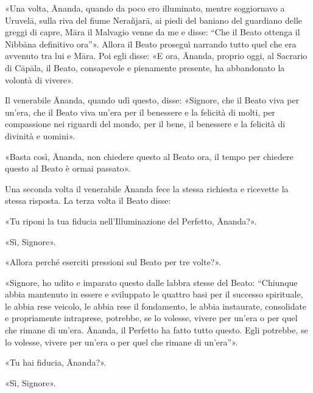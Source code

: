 
«Una volta, Ānanda, quando da poco ero illuminato, mentre soggiornavo a Uruvelā,
sulla riva del fiume Nerañjarā, ai piedi del baniano del guardiano delle greggi
di capre, Māra il Malvagio venne da me e disse: “Che il Beato ottenga il Nibbāna
definitivo ora”». Allora il Beato proseguì narrando tutto quel che era avvenuto
tra lui e Māra. Poi egli disse: «E ora, Ānanda, proprio oggi, al Sacrario di
Cāpāla, il Beato, consapevole e pienamente presente, ha abbandonato la volontà
di vivere».

Il venerabile Ānanda, quando udì questo, disse: «Signore, che il Beato viva per
un’era, che il Beato viva un’era per il benessere e la felicità di molti, per
compassione nei riguardi del mondo, per il bene, il benessere e la felicità di
divinità e uomini».

«Basta così, Ānanda, non chiedere questo al Beato ora, il tempo per chiedere
questo al Beato è ormai passato».

Una seconda volta il venerabile Ānanda fece la stessa richiesta e ricevette la
stessa risposta. La terza volta il Beato disse:

«Tu riponi la tua fiducia nell’Illuminazione del Perfetto, Ānanda?».

«Sì, Signore».

«Allora perché eserciti pressioni sul Beato per tre volte?».

«Signore, ho udito e imparato questo dalle labbra stesse del Beato: “Chiunque
abbia mantenuto in essere e sviluppato le quattro basi per il successo
spirituale, le abbia rese veicolo, le abbia rese il fondamento, le abbia
instaurate, consolidate e propriamente intraprese, potrebbe, se lo volesse,
vivere per un’era o per quel che rimane di un’era. Ānanda, il Perfetto ha fatto
tutto questo. Egli potrebbe, se lo volesse, vivere per un’era o per quel che
rimane di un’era”».

«Tu hai fiducia, Ānanda?».

«Sì, Signore».

